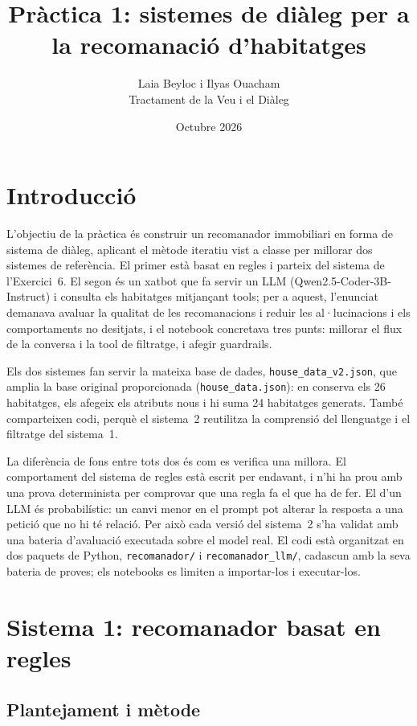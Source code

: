 \documentclass[10pt,a4paper]{article}
\title{Pràctica 1: sistemes de diàleg per a la recomanació d'habitatges}
\author{Laia Beyloc i Ilyas Ouacham\\[2pt]\small Tractament de la Veu i el Diàleg}
\date{Octubre 2026}
\begin{document}
\maketitle

\section{Introducció}

L'objectiu de la pràctica és construir un recomanador immobiliari en forma de sistema de diàleg, aplicant el mètode iteratiu vist a classe per millorar dos sistemes de referència. El primer està basat en regles i parteix del sistema de l'Exercici~6. El segon és un xatbot que fa servir un LLM (Qwen2.5-Coder-3B-Instruct) i consulta els habitatges mitjançant tools; per a aquest, l'enunciat demanava avaluar la qualitat de les recomanacions i reduir les al·lucinacions i els comportaments no desitjats, i el notebook concretava tres punts: millorar el flux de la conversa i la tool de filtratge, i afegir guardrails.

Els dos sistemes fan servir la mateixa base de dades, \texttt{house\_data\_v2.json}, que amplia la base original proporcionada (\texttt{house\_data.json}): en conserva els 26 habitatges, els afegeix els atributs nous i hi suma 24 habitatges generats. També comparteixen codi, perquè el sistema~2 reutilitza la comprensió del llenguatge i el filtratge del sistema~1.

La diferència de fons entre tots dos és com es verifica una millora. El comportament del sistema de regles està escrit per endavant, i n'hi ha prou amb una prova determinista per comprovar que una regla fa el que ha de fer. El d'un LLM és probabilístic: un canvi menor en el prompt pot alterar la resposta a una petició que no hi té relació. Per això cada versió del sistema~2 s'ha validat amb una bateria d'avaluació executada sobre el model real. El codi està organitzat en dos paquets de Python, \texttt{recomanador/} i \texttt{recomanador\_llm/}, cadascun amb la seva bateria de proves; els notebooks es limiten a importar-los i executar-los.

\section{Sistema 1: recomanador basat en regles}

\subsection{Plantejament i mètode}
\end{document}
